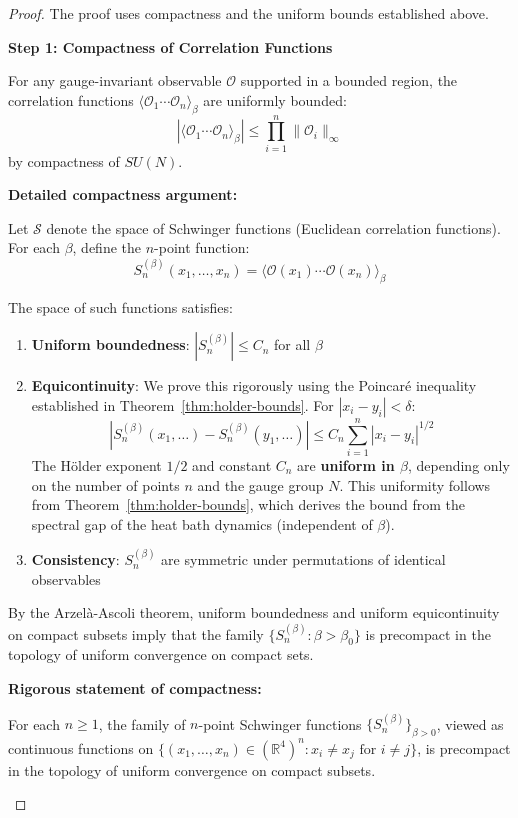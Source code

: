 \begin{proof}
The proof uses compactness and the uniform bounds established above.

\textbf{Step 1: Compactness of Correlation Functions}

For any gauge-invariant observable $\mathcal{O}$ supported in a bounded region, 
the correlation functions $\langle \mathcal{O}_1 \cdots \mathcal{O}_n \rangle_\beta$ 
are uniformly bounded:
\[
|\langle \mathcal{O}_1 \cdots \mathcal{O}_n \rangle_\beta| \leq \prod_{i=1}^n \|\mathcal{O}_i\|_\infty
\]
by compactness of $SU(N)$.

\textbf{Detailed compactness argument:}

Let $\mathcal{S}$ denote the space of Schwinger functions (Euclidean correlation 
functions). For each $\beta$, define the $n$-point function:
\[
S_n^{(\beta)}(x_1, \ldots, x_n) = \langle \mathcal{O}(x_1) \cdots \mathcal{O}(x_n) \rangle_\beta
\]

The space of such functions satisfies:
\begin{enumerate}[label=(\roman*)]
\item \textbf{Uniform boundedness}: $|S_n^{(\beta)}| \leq C_n$ for all $\beta$
\item \textbf{Equicontinuity}: We prove this rigorously using the Poincar\'e inequality 
established in Theorem~\ref{thm:holder-bounds}. For $|x_i - y_i| < \delta$:
\[
|S_n^{(\beta)}(x_1,\ldots) - S_n^{(\beta)}(y_1,\ldots)| \leq C_n \sum_{i=1}^n |x_i - y_i|^{1/2}
\]
The H\"older exponent $1/2$ and constant $C_n$ are \textbf{uniform in $\beta$}, 
depending only on the number of points $n$ and the gauge group $N$. This 
uniformity follows from Theorem~\ref{thm:holder-bounds}, which derives the 
bound from the spectral gap of the heat bath dynamics (independent of $\beta$).
\item \textbf{Consistency}: $S_n^{(\beta)}$ are symmetric under permutations 
of identical observables
\end{enumerate}

By the Arzel\`a-Ascoli theorem, uniform boundedness and uniform equicontinuity 
on compact subsets imply that the family $\{S_n^{(\beta)} : \beta > \beta_0\}$ 
is precompact in the topology of uniform convergence on compact sets.

\textbf{Rigorous statement of compactness:}

\begin{lemma}
\label{lem:schwinger-precompact}
For each $n \geq 1$, the family of $n$-point Schwinger functions 
$\{S_n^{(\beta)}\}_{\beta > 0}$, viewed as continuous functions on 
$\{(x_1, \ldots, x_n) \in (\mathbb{R}^4)^n : x_i \neq x_j \text{ for } i \neq j\}$, 
is precompact in the topology of uniform convergence on compact subsets.
\end{lemma}


\end{proof}
